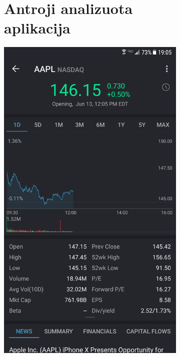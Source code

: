 \documentclass[a4paper,12pt,fleqn]{article}
\begin{document}
\begin{appendices}
\begin{figure}[h!]
	\begin{subfigure}{0.5\textwidth}
		\centering
		\tocless\section{Antroji analizuota aplikacija}
		\includegraphics[scale=0.4]{priedas4.png}
		\label{app:priedas4}
	\end{subfigure}
\end{figure}


\end{appendices}
\end{document}
